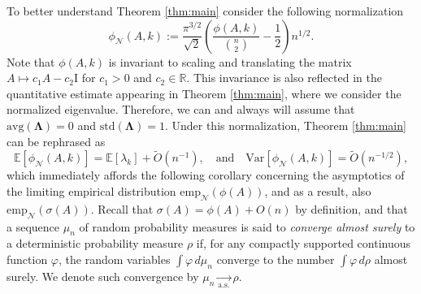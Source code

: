 \documentclass[reqno]{amsart}
\numberwithin{equation}{section}
\newcommand\E{\mathbb{E}}
\newcommand\R{\mathbb{R}}
\newcommand{\emp}{\mathrm{emp}}
\begin{document}
To better understand Theorem \ref{thm:main} consider the following normalization
\[\phi_{\mathcal{N}}(A,k):=\frac{\pi^{3/2}}{\sqrt{2}}\left(\frac{\phi(A,k)}{{n \choose 2}}-\frac{1}{2}\right) n^{1/2}.\]
Note that $\phi(A,k)$ is invariant to scaling and translating the matrix $A\mapsto c_{1}A-c_{2}\mathrm{I}$ for $c_1>0$ and $c_{2}\in\R$. This invariance is also reflected in the quantitative estimate appearing in Theorem \ref{thm:main}, where we consider the normalized eigenvalue. Therefore, we can and always will assume that $\mathrm{avg}(\bm{\Lambda}) = 0$ and $\mathrm{std}(\bm{\Lambda}) = 1$. Under this normalization, Theorem \ref{thm:main} can be rephrased as
\begin{equation*}
    \E \left[\phi_{\mathcal{N}}(A,k)\right] =  \E[\lambda_k]  + \tilde O\left(n^{-1}\right),\quad\text{and}\quad \mathrm{Var}\left[\phi_{\mathcal{N}}(A,k)\right]=\tilde O\left(n^{-1/2}\right),
\end{equation*}
which immediately affords the following corollary concerning the asymptotics of the limiting empirical distribution $\emp_{\mathcal{N}}\left(\phi(A)\right)$, and as a result, also $\emp_{\mathcal{N}}\left(\sigma(A)\right)$. Recall that $\sigma(A)=\phi(A)+O(n)$ by definition, and that a sequence $\mu_{n}$ of random probability measures is said to \emph{converge almost surely} to a deterministic probability measure $\rho$ if, for any compactly supported continuous function $\varphi$, the random variables $\int\varphi \, d\mu_{n}$ converge to the number $\int\varphi \, d\rho$ almost surely. We denote such convergence by $\mu_{n}\underset{\mathrm{a.s.}}{\longrightarrow}\rho$.
\end{document}
